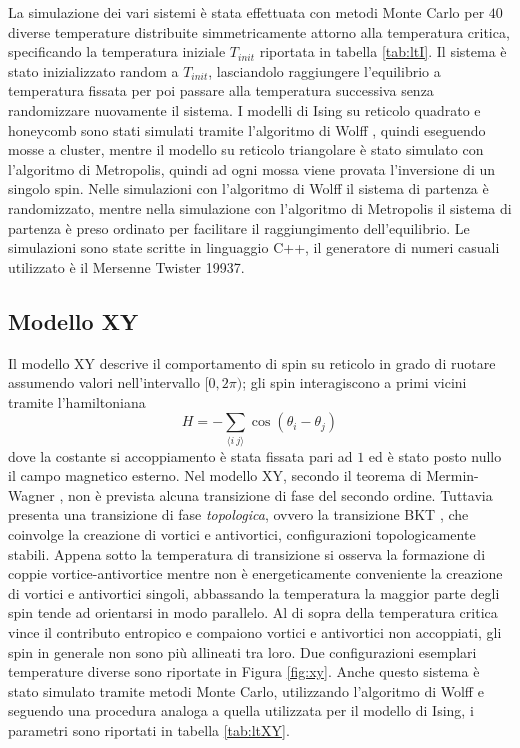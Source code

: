 \documentclass{article}
\begin{document}
La simulazione dei vari sistemi è stata effettuata con metodi Monte Carlo per $40$ diverse temperature distribuite simmetricamente attorno alla temperatura critica, specificando la temperatura iniziale $T_{init}$ riportata in tabella \ref{tab:ltI}.
Il sistema è stato inizializzato random a $T_{init}$, lasciandolo raggiungere l'equilibrio a temperatura fissata per poi passare alla temperatura successiva senza randomizzare nuovamente il sistema.
I modelli di Ising su reticolo quadrato e honeycomb sono stati simulati tramite l'algoritmo di Wolff \cite{wolff}, quindi eseguendo mosse a cluster, mentre il modello su reticolo triangolare è stato simulato con l'algoritmo di Metropolis, quindi ad ogni mossa viene provata l'inversione di un singolo spin.
Nelle simulazioni con l'algoritmo di Wolff il sistema di partenza è randomizzato, mentre nella simulazione con l'algoritmo di Metropolis il sistema di partenza è preso ordinato per facilitare il raggiungimento dell'equilibrio.
Le simulazioni sono state scritte in linguaggio C++, il generatore di numeri casuali utilizzato è il Mersenne Twister 19937.

\subsection{Modello XY}
Il modello XY descrive il comportamento di spin su reticolo in grado di ruotare assumendo valori nell'intervallo $[0,2\pi)$; gli spin interagiscono a primi vicini tramite l'hamiltoniana
\begin{equation}
H=-\sum_{\langle i~j\rangle} \cos(\theta_i-\theta_j)
\end{equation}
dove la costante si accoppiamento è stata fissata pari ad $1$ ed è stato posto nullo il campo magnetico esterno.
Nel modello XY,  secondo il teorema di Mermin-Wagner \cite{mermin}, non è prevista alcuna transizione di fase del secondo ordine.
Tuttavia presenta una transizione di fase \emph{topologica}, ovvero la transizione BKT \cite{kosterlitz}, che coinvolge la creazione di vortici e antivortici, configurazioni topologicamente stabili.
Appena sotto la temperatura di transizione si osserva la formazione di coppie vortice-antivortice mentre non è energeticamente conveniente la creazione di vortici e antivortici singoli, abbassando la temperatura la maggior parte degli spin tende ad orientarsi in modo parallelo.
Al di sopra della temperatura critica vince il contributo entropico e compaiono vortici e antivortici non accoppiati, gli spin in generale non sono più allineati tra loro.
Due configurazioni esemplari temperature diverse sono riportate in Figura \ref{fig:xy}.
Anche questo sistema è stato simulato tramite metodi Monte Carlo, utilizzando l'algoritmo di Wolff e seguendo una procedura analoga a quella utilizzata per il modello di Ising, i parametri sono riportati in tabella \ref{tab:ltXY}.
\end{document}

